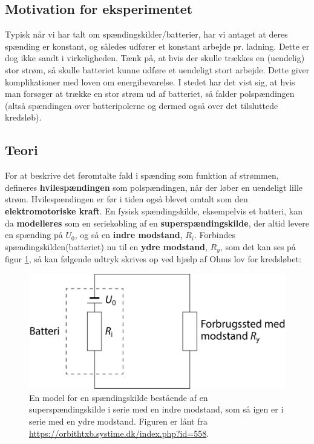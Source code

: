 \documentclass[a4paper, 12pt]{article}
\begin{document}
\subsection{Motivation for eksperimentet}
\label{sec:orgc49d000}

Typisk når vi har talt om spændingskilder/batterier, har vi antaget at deres spænding er konstant, og således udfører et konstant arbejde pr. ladning. Dette er dog ikke sandt i virkeligheden. 
Tænk på, at hvis der skulle trækkes en (uendelig) stor strøm, så skulle batteriet kunne udføre et uendeligt stort arbejde. Dette giver komplikationer med loven om energibevarelse.
I stedet har det vist sig, at hvis man forsøger at trække en stor strøm ud af batteriet, så falder polspændingen (altså spændingen over batteripolerne og dermed også over det tilsluttede kredsløb).

\subsection{Teori}
\label{sec:orgdd75834}

For at beskrive det føromtalte fald i spænding som funktion af strømmen, defineres \textbf{hvilespændingen} som polspændingen, når der løber en uendeligt lille strøm. Hvilespændingen er før i tiden også blevet omtalt som den \textbf{elektromotoriske kraft}.
En fysisk spændingskilde, eksempelvis et batteri, kan da \textbf{modelleres} som en seriekobling af en \textbf{superspændingskilde}, der altid levere en spænding på \(U_0\), og så en \textbf{indre modstand}, \(R_i\). Forbindes spændingskilden(batteriet) nu til en \textbf{ydre modstand}, \(R_y\), som det kan ses på figur \ref{forsoeg_3}, så kan følgende udtryk skrives op ved hjælp af Ohms lov for kredsløbet:

\begin{figure}[htbp]
\centering
\includegraphics[width=0.6\linewidth]{./img/forsoeg_3.png}
\caption{\label{forsoeg_3}En model for en spændingskilde bestående af en superspændingskilde i serie med en indre modstand, som så igen er i serie med en ydre modstand. Figuren er lånt fra \url{https://orbithtxb.systime.dk/index.php?id=558}.}
\end{figure}
\end{document}

